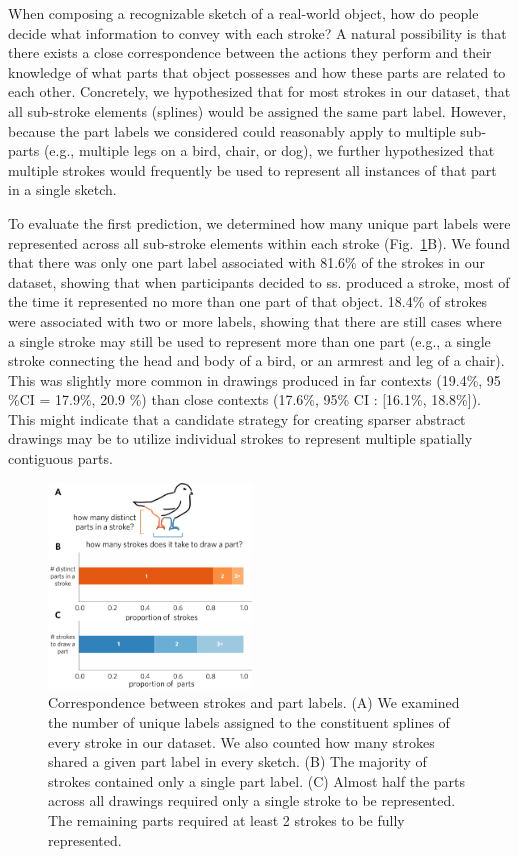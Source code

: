 \documentclass[10pt,letterpaper]{article}
\begin{document}
When composing a recognizable sketch of a real-world object, how do people decide what information to convey with each stroke? 
A natural possibility is that there exists a close correspondence between the actions they perform and their knowledge of what parts that object possesses and how these parts are related to each other.
Concretely, we hypothesized that for most strokes in our dataset, that all sub-stroke elements (splines) would be assigned the same part label. 
However, because the part labels we considered could reasonably apply to multiple sub-parts (e.g., multiple legs on a bird, chair, or dog), we further hypothesized that multiple strokes would frequently be used to represent all instances of that part in a single sketch.

To evaluate the first prediction, we determined how many unique part labels were represented across all sub-stroke elements within each stroke (Fig.~\ref{stroke_to_part}B). 
We found that there was only one part label associated with 81.6\% of the strokes in our dataset, showing that when participants decided to  ss. produced a stroke, most of the time it represented no more than one part of that object. 
18.4\% of strokes were associated with two or more labels, showing that there are still cases where a single stroke may still be used to represent more than one part (e.g., a single stroke connecting the head and body of a bird, or an armrest and leg of a chair). 
This was slightly more common in drawings produced in far contexts (19.4\%, 95 \%CI = 17.9\%, 20.9 \%) than close contexts (17.6\%, 95\% CI : [16.1\%, 18.8\%]).  This might indicate that a candidate strategy for creating sparser abstract drawings may be to utilize individual strokes to represent multiple spatially contiguous parts. 

\begin{figure}[htbp]
\centering
\includegraphics[width=0.48\textwidth]{figures/5_stroke_part_relationship.pdf}
\caption{Correspondence between strokes and part labels. (A) We examined the number of unique labels assigned to the constituent splines of every stroke in our dataset. We also counted how many strokes shared a given part label in every sketch. (B) The majority of strokes contained only a single part label. (C) Almost half the parts across all drawings required only a single stroke to be represented. The remaining parts required at least 2 strokes to be fully represented. }
\label{stroke_to_part}
\end{figure}
\end{document}
